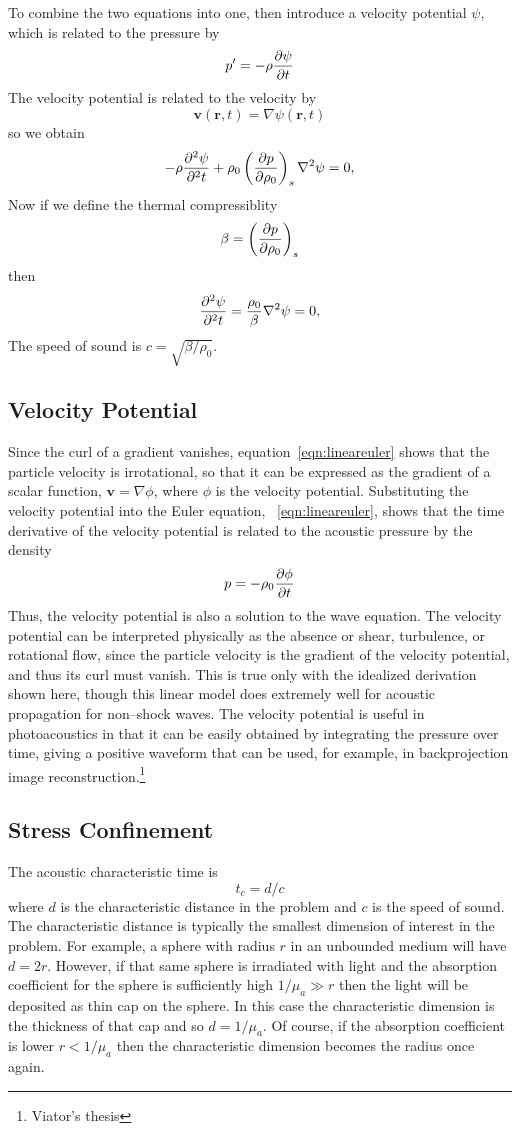 \documentclass{article}
\begin{document}
To combine the two equations into one, then introduce a velocity potential $\psi$, which
is related to the pressure by
$$
p' = -\rho {\partial \psi\over\partial t}
$$
The velocity potential is related to the velocity by
$$
\mathbf{v}(\mathbf{r},t)=\nabla \psi(\mathbf{r},t)
$$
so we obtain
$$
-\rho {\partial^2 \psi\over\partial^2 t} + \rho_0\left({\partial p\over \partial \rho_0}\right)_s\nabla^2 \psi = 0,
$$
Now if we define the thermal compressiblity
$$
\beta = \left({\partial p\over \partial \rho_0}\right)_s
$$
then
$$
{\partial^2 \psi\over\partial^2 t} = {\rho_0\over \beta} \nabla^2 \psi = 0,
$$
The speed of sound is $c=\sqrt{\beta/\rho_0}$.

\subsection{Velocity Potential}

Since the curl of a gradient vanishes, equation~\ref{eqn:lineareuler}
shows that the particle velocity is irrotational, so that it can be
expressed as the gradient of a scalar function, $\mathbf{v}=\nabla \phi$,
where $\phi$ is the velocity potential.  Substituting the velocity
potential into the Euler equation, ~\ref{eqn:lineareuler}, shows that
the time derivative of the velocity potential is related to the acoustic
pressure by the density
$$
p=-\rho_0 {\partial \phi\over \partial t}
$$
Thus, the velocity potential is also a solution to the wave equation. 
The velocity potential can be interpreted physically as the absence or
shear, turbulence, or rotational flow, since the particle velocity is
the gradient of the velocity potential, and thus its curl must vanish. 
This is true only with the idealized derivation shown here, though this
linear model does extremely well for acoustic propagation for non--shock
waves.  The velocity potential is useful in photoacoustics
in that it can be easily obtained by integrating the pressure over time,
giving a positive waveform that can be used, for example, in
backprojection image reconstruction.\footnote{Viator's thesis}

\subsection{Stress Confinement}
The acoustic characteristic time is
$$
t_c = d/c
$$
where $d$ is the characteristic distance in the problem and $c$ is the speed of sound.
The characteristic distance is typically the smallest dimension of interest
in the problem.  For example, a sphere with radius $r$ in an unbounded medium
will have $d=2r$.  However, if that same sphere is irradiated with light and the
absorption coefficient for the sphere is sufficiently high $1/\mu_a\gg r$ then
the light will be deposited as thin cap on the sphere.  In this case the characteristic
dimension is the thickness of that cap and so $d = 1/\mu_a$.  Of course, if the 
absorption coefficient is lower $r < 1/\mu_a$ then the characteristic dimension 
becomes the radius once again.  
\end{document}
